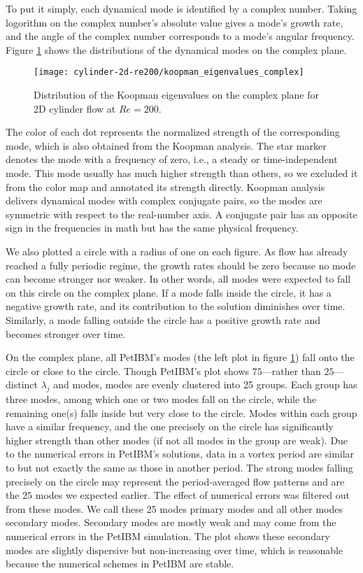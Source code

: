 To put it simply, each dynamical mode is identified by a complex number.
Taking logorithm on the complex number's absolute value gives a mode's growth rate, and the angle of the complex number corresponds to a mode's angular frequency.
Figure \ref{fig:cylinder-re200-koopman-eig-dist} shows the distributions of the dynamical modes on the complex plane.
\begin{figure}
    \centering%
    \texttt{[image: cylinder-2d-re200/koopman\_eigenvalues\_complex]}%
    \caption{%
        Distribution of the Koopman eigenvalues on the complex plane for 2D cylinder flow at $Re=\num{200}$.
    }
    \label{fig:cylinder-re200-koopman-eig-dist}%
\end{figure}
The color of each dot represents the normalized strength of the corresponding mode, which is also obtained from the Koopman analysis.
The star marker denotes the mode with a frequency of zero, i.e., a steady or time-independent mode.
This mode usually has much higher strength than others, so we excluded it from the color map and annotated its strength directly.
Koopman analysis delivers dynamical modes with complex conjugate pairs, so the modes are symmetric with respect to the real-number axis. 
A conjugate pair has an opposite sign in the frequencies in math but has the same physical frequency.

We also plotted a circle with a radius of one on each figure.
As flow has already reached a fully periodic regime, the growth rates should be zero because no mode can become stronger nor weaker.
In other words, all modes were expected to fall on this circle on the complex plane.
If a mode falls inside the circle, it has a negative growth rate, and its contribution to the solution diminishes over time.
Similarly, a mode falling outside the circle has a positive growth rate and becomes stronger over time.

On the complex plane, all PetIBM's modes (the left plot in figure \ref{fig:cylinder-re200-koopman-eig-dist}) fall onto the circle or close to the circle.
Though PetIBM's plot shows $75$---rather than $25$---distinct $\lambda_j$ and modes, modes are evenly clustered into 25 groups.
Each group has three modes, among which one or two modes fall on the circle, while the remaining one(s) falls inside but very close to the circle.
Modes within each group have a similar frequency, and the one precisely on the circle has significantly higher strength than other modes (if not all modes in the group are weak).
Due to the numerical errors in PetIBM's solutions, data in a vortex period are similar to but not exactly the same as those in another period.
The strong modes falling precisely on the circle may represent the period-averaged flow patterns and are the $25$ modes we expected earlier. 
The effect of numerical errors was filtered out from these modes.
We call these 25 modes primary modes and all other modes secondary modes.
Secondary modes are mostly weak and may come from the numerical errors in the PetIBM simulation.
The plot shows these secondary modes are slightly dispersive but non-increasing over time, which is reasonable because the numerical schemes in PetIBM are stable.

